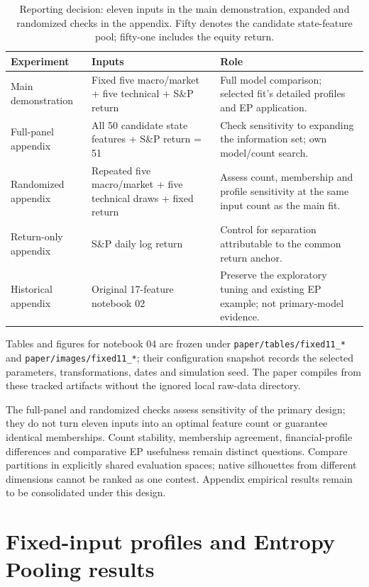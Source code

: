 \documentclass[11pt,a4paper]{article}
\begin{document}
\begin{table}[htbp]
\centering
\small
\begin{tabularx}{\textwidth}{@{}p{}XX@{}}
\toprule
Experiment & Inputs & Role\\
\midrule
Main demonstration & Fixed five macro/market + five technical + S\&P return & Full model comparison; selected fit's detailed profiles and EP application.\\[3pt]
Full-panel appendix & All 50 candidate state features + S\&P return = 51 & Check sensitivity to expanding the information set; own model/count search.\\[3pt]
Randomized appendix & Repeated five macro/market + five technical draws + fixed return & Assess count, membership and profile sensitivity at the same input count as the main fit.\\[3pt]
Return-only appendix & S\&P daily log return & Control for separation attributable to the common return anchor.\\[3pt]
Historical appendix & Original 17-feature notebook 02 & Preserve the exploratory tuning and existing EP example; not primary-model evidence.\\
\bottomrule
\end{tabularx}
\caption{Reporting decision: eleven inputs in the main demonstration, expanded and randomized checks in the appendix. Fifty denotes the candidate state-feature pool; fifty-one includes the equity return.}
\label{tab:experiment-roles}
\end{table}

Tables and figures for notebook 04 are frozen under \texttt{paper/tables/fixed11\_*} and \texttt{paper/images/fixed11\_*}; their configuration snapshot records the selected parameters, transformations, dates and simulation seed. The paper compiles from these tracked artifacts without the ignored local raw-data directory.

The full-panel and randomized checks assess sensitivity of the primary design; they do not turn eleven inputs into an optimal feature count or guarantee identical memberships. Count stability, membership agreement, financial-profile differences and comparative EP usefulness remain distinct questions. Compare partitions in explicitly shared evaluation spaces; native silhouettes from different dimensions cannot be ranked as one contest. Appendix empirical results remain to be consolidated under this design.

\section{Fixed-input profiles and Entropy Pooling results}
\label{sec:fixed-results}
\end{document}
